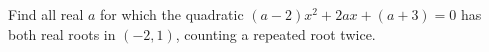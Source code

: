 Find all real $a$ for which the quadratic $(a-2)x^2+2ax+(a+3)=0$ has both real roots in $(-2,1)$, counting a repeated root twice.
